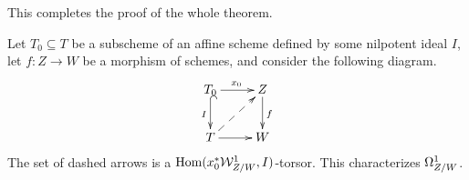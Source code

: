 This completes the proof of the whole theorem.

\begin{remark}
 Let $T_0\subseteq T$ be a subscheme of an affine scheme defined by some nilpotent  ideal $I$, let $f:Z\to W$ be a morphism of schemes, and consider the following diagram.
 \[\xymatrix{
  T_0\ar@{^(->}[d]_I \ar[r]^{x_0} & Z\ar[d]^f\\
  T \ar@{-->}[ur] \ar[r] & W
 }\]
 The set of dashed arrows is a $\operatorname{Hom}(x_0^*\mathcal{W}^1_{Z/W},I)$-torsor. This characterizes $\Omega^1_{Z/W}$.

\end{remark}

